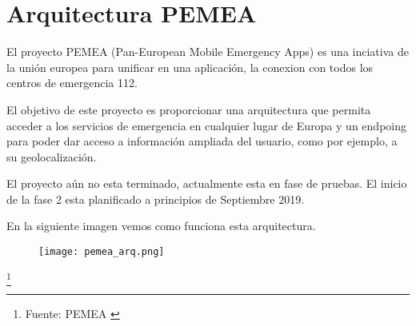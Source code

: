 
\section{Arquitectura PEMEA}

El proyecto PEMEA (Pan-European Mobile Emergency Apps) es una inciativa de la unión europea para unificar en una aplicación, la conexion con todos los centros de emergencia 112.

El objetivo de este proyecto es proporcionar una arquitectura que permita acceder a los servicios de emergencia en cualquier lugar de Europa y un endpoing para poder dar acceso a información ampliada del usuario, como por ejemplo, a su geolocalización.

El proyecto aún no esta terminado, actualmente esta en fase de pruebas. El inicio de la fase 2 esta planificado a principios de Septiembre 2019.

En la siguiente imagen vemos como funciona esta arquitectura.

\begin{figure}[h]
\texttt{[image: pemea\_arq.png]} 
\end{figure}

\footnote{Fuente: PEMEA \cite{PEMEA}}